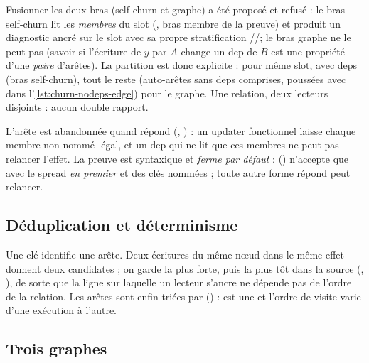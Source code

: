 \begin{decision}
Fusionner les deux bras (self-churn et graphe) a été proposé et refusé : le bras self-churn
lit les \emph{membres} du slot (, bras membre de la preuve) et produit
un diagnostic ancré sur le slot avec sa propre stratification \Error/\Warning/\Info ; le
bras graphe ne le peut pas (savoir si l'écriture de $y$ par $A$ change un dep de $B$ est une
propriété d'une \emph{paire} d'arêtes). La partition est donc explicite : 
pour \og même slot, avec deps\fg{} (bras self-churn), tout le reste (auto-arêtes sans deps
comprises, poussées avec  dans l'\cref{lst:churn-nodeps-edge}) pour le
graphe. Une relation, deux lecteurs disjoints : aucun double rapport.
\end{decision}

L'arête  est abandonnée quand  répond 
(, ) : un updater fonctionnel
 laisse chaque membre non nommé
-égal, et un dep qui ne lit que ces membres ne peut pas relancer l'effet.
La preuve est syntaxique et \emph{ferme par défaut} : 
() n'accepte que  avec le
spread \emph{en premier} et des clés nommées ; toute autre forme répond \og peut
relancer\fg.

\subsection{Déduplication et déterminisme}

Une clé  identifie une arête. Deux écritures du
même nœud dans le même effet donnent deux candidates ; on garde la plus forte, puis la plus
tôt dans la source (, ),
de sorte que la ligne sur laquelle un lecteur s'ancre ne dépende pas de l'ordre de la
relation. Les arêtes sont enfin triées par 
() :  est une  et
l'ordre de visite varie d'une exécution à l'autre.

\subsection{Trois graphes}

